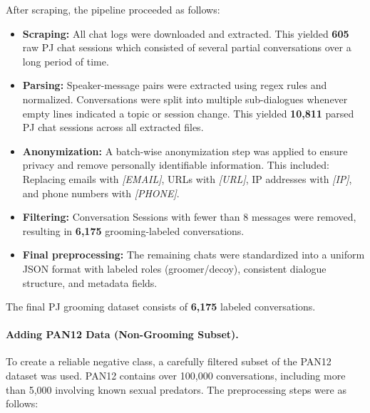 After scraping, the pipeline proceeded as follows:
\begin{itemize}
    \item \textbf{Scraping:} All chat logs were downloaded and extracted. This yielded \textbf{605} raw PJ chat sessions which consisted of several partial conversations over a long period of time.
    \item \textbf{Parsing:} Speaker-message pairs were extracted using regex rules and normalized. Conversations were split into multiple sub-dialogues whenever empty lines indicated a topic or session change. This yielded \textbf{10,811} parsed PJ chat sessions across all extracted files.
    \item \textbf{Anonymization:} A batch-wise anonymization step was applied to ensure privacy and remove personally identifiable information. This included: Replacing emails with \textit{[EMAIL]}, URLs with \textit{[URL]}, IP addresses with \textit{[IP]}, and phone numbers with \textit{[PHONE]}.
    \item \textbf{Filtering:} Conversation Sessions with fewer than 8 messages were removed, resulting in \textbf{6,175} grooming-labeled conversations.
    \item \textbf{Final preprocessing:} The remaining chats were standardized into a uniform JSON format with labeled roles (groomer/decoy), consistent dialogue structure, and metadata fields.
\end{itemize}

The final PJ grooming dataset consists of \textbf{6,175} labeled conversations.

\paragraph{Adding PAN12 Data (Non-Grooming Subset).}
To create a reliable negative class, a carefully filtered subset of the PAN12 dataset was used. PAN12 contains over 100{,}000 conversations, including more than 5{,}000 involving known sexual predators. The preprocessing steps were as follows:


